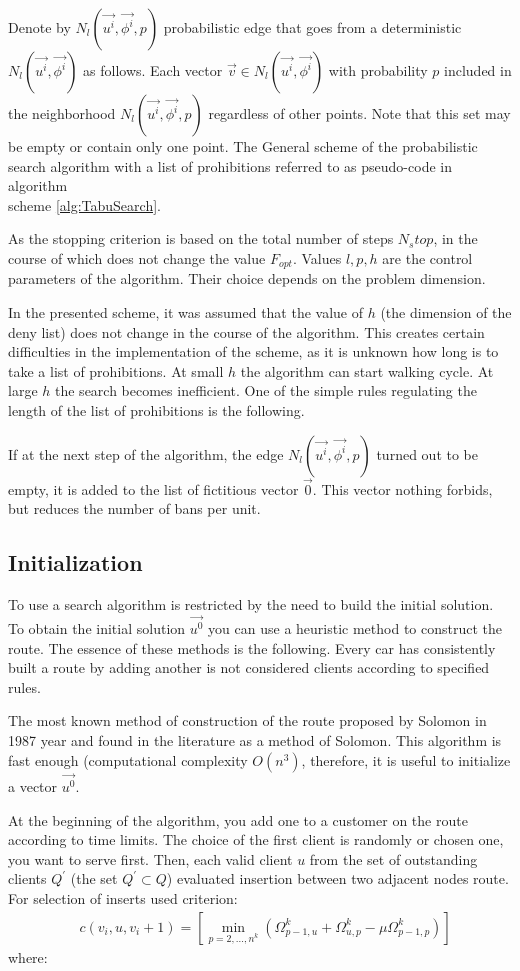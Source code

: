 \documentclass[]{TAACpaper}
\begin{document}
Denote by $N_l(\vec{u^i},\vec{\phi^i},p)$ probabilistic edge that goes from a deterministic $N_l(\vec{u^i},\vec{\phi^i})$ as follows. Each vector $\vec{v} \in N_l(\vec{u^i},\vec{\phi^i})$ with probability $p$ included in the neighborhood $N_l(\vec{u^i},\vec{\phi^i},p)$ regardless of other points. Note that this set may be empty or contain only one point. The General scheme of the probabilistic search algorithm with a list of prohibitions referred to as pseudo-code in algorithm \\
scheme \ref{alg:TabuSearch}.

As the stopping criterion is based on the total number of steps $N_stop$, in the course of which does not change the value $F_{opt}$. Values $l,p,h$ are the control parameters of the algorithm. Their choice depends on the problem dimension.

In the presented scheme, it was assumed that the value of $h$ (the dimension of the deny list) does not change in the course of the algorithm. This creates certain difficulties in the implementation of the scheme, as it is unknown how long is to take a list of prohibitions. At small $h$ the algorithm can start walking cycle. At large $h$ the search becomes inefficient. One of the simple rules regulating the length of the list of prohibitions is the following.

If at the next step of the algorithm, the edge  $N_l(\vec{u^i},\vec{\phi^i},p)$ turned out to be empty, it is added to the list of fictitious vector $\vec{0}$. This vector nothing forbids, but reduces the number of bans per unit.

\subsection{Initialization}
To use a search algorithm is restricted by the need to build the initial solution. To obtain the initial solution $\vec{u^0}$ you can use a heuristic method to construct the route. The essence of these methods is the following. Every car has consistently built a route by adding another is not considered clients according to specified rules.

The most known method of construction of the route proposed by Solomon in 1987 year and found in the literature as a method of Solomon. This algorithm is fast enough (computational complexity $O(n^3)$, therefore, it is useful to initialize a vector $\vec{u^0}$.

At the beginning of the algorithm, you add one to a customer on the route according to time limits. The choice of the first client is randomly or chosen one, you want to serve first. Then, each valid client $u$ from the set of outstanding clients $Q^{'}$ (the set $Q^{'}\subset{Q}$) evaluated insertion between two adjacent nodes route. For selection of inserts used criterion:
\begin{align} 
& c(v_i,u,v_i+1)=[\min_{p=2,\dots,n^k}(\Omega_{p-1,u}^k+\Omega_{u,p}^k-\mu \Omega_{p-1,p}^k) ]
\end{align}	
where:
\end{document}
